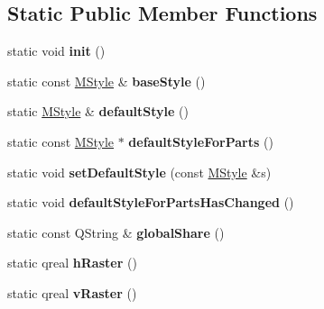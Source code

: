 \subsection*{Static Public Member Functions}
\begin{DoxyCompactItemize}
\item 
\mbox{\label{class_ms_1_1_m_score_a5aa8d0420847a57b134f7f80311e2507}} 
static void {\bfseries init} ()
\item 
\mbox{\label{class_ms_1_1_m_score_a3763a735d428c8533682842799358238}} 
static const \hyperlink{class_ms_1_1_m_style}{M\+Style} \& {\bfseries base\+Style} ()
\item 
\mbox{\label{class_ms_1_1_m_score_a5ab5ca32eec550d612d6459c587a98fe}} 
static \hyperlink{class_ms_1_1_m_style}{M\+Style} \& {\bfseries default\+Style} ()
\item 
\mbox{\label{class_ms_1_1_m_score_a77229f0e2dc2e58780c522b4f6f2dcc5}} 
static const \hyperlink{class_ms_1_1_m_style}{M\+Style} $\ast$ {\bfseries default\+Style\+For\+Parts} ()
\item 
\mbox{\label{class_ms_1_1_m_score_a729b06d11a8bd7e7a066b29f9376c59c}} 
static void {\bfseries set\+Default\+Style} (const \hyperlink{class_ms_1_1_m_style}{M\+Style} \&s)
\item 
\mbox{\label{class_ms_1_1_m_score_a09aa94a406d9a979685766606d937ff0}} 
static void {\bfseries default\+Style\+For\+Parts\+Has\+Changed} ()
\item 
\mbox{\label{class_ms_1_1_m_score_ae940d0d808cb5abca9208f6d94267a6f}} 
static const Q\+String \& {\bfseries global\+Share} ()
\item 
\mbox{\label{class_ms_1_1_m_score_a55f04966db77dd07ef717f6833317796}} 
static qreal {\bfseries h\+Raster} ()
\item 
\mbox{\label{class_ms_1_1_m_score_a175bfbdaf46e45ac57c7b246fb91c4e2}} 
static qreal {\bfseries v\+Raster} ()
\item 
\mbox{\label{class_ms_1_1_m_score_acfc35176c0f1ccb0446dd4e91eed2b4b}} 

\end{DoxyCompactItemize}
